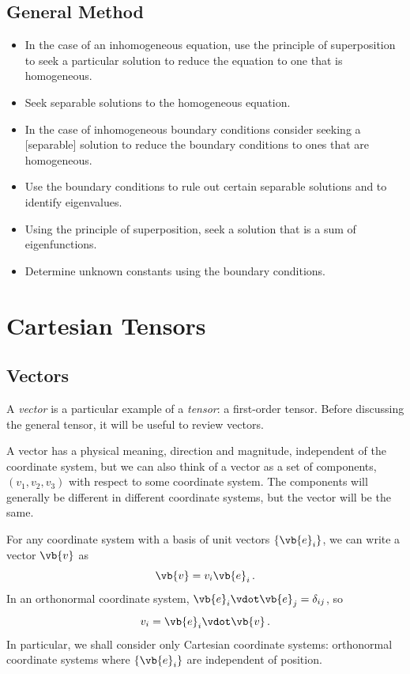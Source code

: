 \documentclass{article}
\theoremstyle{plain}\theoremheaderfont{\normalfont\itshape}\theorembodyfont{\rmfamily}\theoremseparator{.}\newtheorem*{rem}{Remark}\newtheorem*{ex}{Example}\newtheorem*{proof}{Proof}\newtheorem*{altp}{Alternative proof}
\theoremstyle{plain}\theoremheaderfont{\normalfont\bfseries}\theorembodyfont{\rmfamily}\theoremseparator{.}\newtheorem{thm}{Theorem}[section]\newtheorem{lem}[thm]{Lemma}\newtheorem{prop}[thm]{Proposition}\newtheorem*{cor}{Corollary}\newtheorem{defn}[thm]{Definition}\newtheorem{clm}[thm]{Claim}\newtheorem{clminproof}{Claim}
\theoremstyle{break}\theoremheaderfont{\normalfont\itshape}\theorembodyfont{\rmfamily}\theoremseparator{.\medskip}\newtheorem*{proofskip}{Proof}\newtheorem*{exs}{Examples}\newtheorem*{rems}{Remarks}
\theoremstyle{break}\theoremheaderfont{\normalfont\bfseries}\theorembodyfont{\rmfamily}\theoremseparator{.\medskip}\newtheorem{lemskip}[thm]{Lemma}\newtheorem{defnskip}[thm]{Definition}\newtheorem{propskip}[thm]{Proposition}\newtheorem{thmskip}[thm]{Theorem}
\numberwithin{equation}{section}
\begin{document}
	\subsection{General Method}
	\begin{itemize}[topsep=0pt,leftmargin=50pt]
		\item In the case of an inhomogeneous equation, use the principle of superposition to seek a particular solution to reduce the equation to one that is homogeneous.
		\item Seek separable solutions to the homogeneous equation.
		\item In the case of inhomogeneous boundary conditions consider seeking a [separable] solution to reduce the boundary conditions to ones that are homogeneous.
		\item Use the boundary conditions to rule out certain separable solutions and to identify eigenvalues.
		\item Using the principle of superposition, seek a solution that is a sum of eigenfunctions.
		\item Determine unknown constants using the boundary conditions.
	\end{itemize}
	
	\newpage

	\section{Cartesian Tensors}
	\subsection{Vectors}
	A \textit{vector} is a particular example of a \textit{tensor}: a first-order tensor. Before discussing the general tensor, it will be useful to review vectors.

	A vector has a physical meaning, direction and magnitude, independent of the coordinate system, but we can also think of a vector as a set of components, \((v_1,v_2,v_3)\) with respect to some coordinate system. The components will generally be different in different coordinate systems, but the vector will be the same.

	For any coordinate system with a basis of unit vectors \(\{\vb{e}_i\}\), we can write a vector \(\vb{v}\) as
	\[\vb{v}=v_i\vb{e}_i\,.\]
	In an orthonormal coordinate system, \(\vb{e}_i\vdot\vb{e}_j=\delta_{ij}\), so
	\[v_i=\vb{e}_i\vdot\vb{v}\,.\]
	In particular, we shall consider only Cartesian coordinate systems: orthonormal coordinate systems where \(\{\vb{e}_i\}\) are independent of position.
\end{document}
